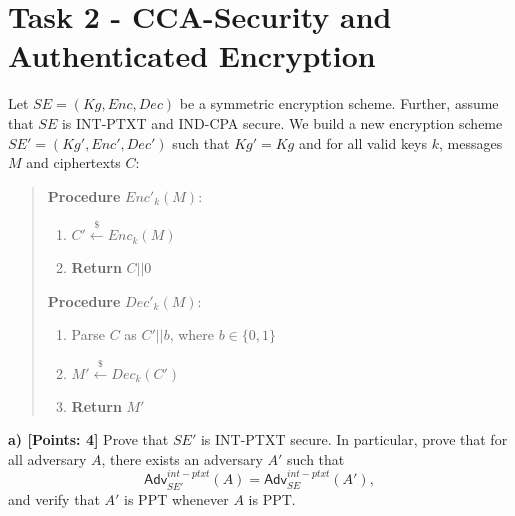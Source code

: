 \documentclass[12pt]{article}
\newcommand{\bits}{\{0,1\}}
\newcommand{\getsr}{\stackrel{\$}{\gets}}
\newcommand{\Adv}{\textsf{Adv}}
\theoremstyle{definition}
\begin{document}
\section{Task 2 - CCA-Security and Authenticated Encryption}
Let $SE = (Kg, Enc, Dec)$ be a symmetric encryption scheme. Further, assume that $SE$ is INT-PTXT and IND-CPA secure. We build a new encryption scheme $SE' = (Kg', Enc', Dec')$ such that $Kg' = Kg$ and for all valid keys $k$, messages $M$ and ciphertexts $C$:
\begin{quote}
\begin{minipage}[t]{0.3\textwidth}
{\bf Procedure} $Enc'_k(M)$:
\begin{enumerate}
\item $C' \getsr Enc_k (M)$
\item {\bf Return} $C||0$
\end{enumerate}
\end{minipage}
\begin{minipage}[t]{0.5\textwidth}
{\bf Procedure} $Dec'_k(M)$:
\begin{enumerate}
\item Parse $C$ as $C'||b$, where $b \in \bits$
\item $M' \getsr Dec_k (C')$
\item {\bf Return} $M'$
\end{enumerate}
\end{minipage}
\end{quote}

{\bf a) [Points: 4]} Prove that $SE'$ is INT-PTXT secure. In particular, prove that for all adversary $A$, there exists an adversary $A'$ such that
$$\Adv_{SE'}^{int-ptxt}(A) = \Adv_{SE}^{int-ptxt}(A'),$$
and verify that $A'$ is PPT whenever $A$ is PPT.
\end{document}
